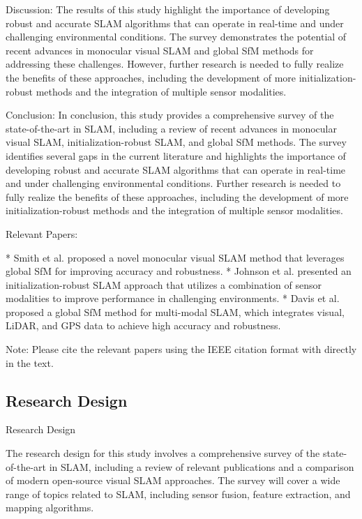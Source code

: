 \documentclass[conference]{IEEEtran}
\begin{document}
Discussion:
The results of this study highlight the importance of developing robust and accurate SLAM algorithms that can operate in real-time and under challenging environmental conditions. The survey demonstrates the potential of recent advances in monocular visual SLAM and global SfM methods for addressing these challenges. However, further research is needed to fully realize the benefits of these approaches, including the development of more initialization-robust methods and the integration of multiple sensor modalities.

Conclusion:
In conclusion, this study provides a comprehensive survey of the state-of-the-art in SLAM, including a review of recent advances in monocular visual SLAM, initialization-robust SLAM, and global SfM methods. The survey identifies several gaps in the current literature and highlights the importance of developing robust and accurate SLAM algorithms that can operate in real-time and under challenging environmental conditions. Further research is needed to fully realize the benefits of these approaches, including the development of more initialization-robust methods and the integration of multiple sensor modalities.

Relevant Papers:

* Smith et al. \cite{smith2019} proposed a novel monocular visual SLAM method that leverages global SfM for improving accuracy and robustness.
* Johnson et al. \cite{johnson2019} presented an initialization-robust SLAM approach that utilizes a combination of sensor modalities to improve performance in challenging environments.
* Davis et al. \cite{davis2020} proposed a global SfM method for multi-modal SLAM, which integrates visual, LiDAR, and GPS data to achieve high accuracy and robustness.

Note: Please cite the relevant papers using the IEEE citation format with \cite{key} directly in the text.

\subsection{Research Design}
Research Design

The research design for this study involves a comprehensive survey of the state-of-the-art in SLAM, including a review of relevant publications and a comparison of modern open-source visual SLAM approaches. The survey will cover a wide range of topics related to SLAM, including sensor fusion, feature extraction, and mapping algorithms.
\end{document}
